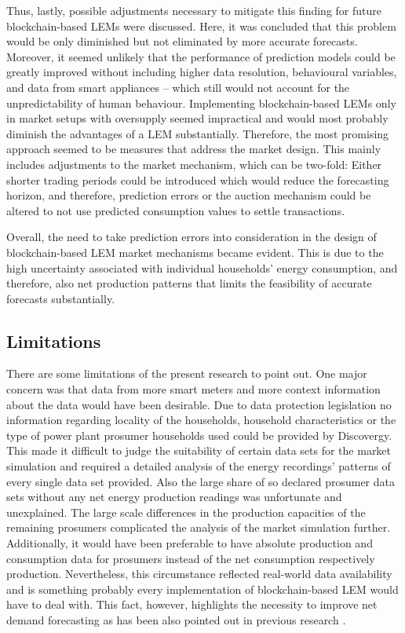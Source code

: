 Thus, lastly, possible adjustments necessary to mitigate this finding for future blockchain-based LEMs were discussed. Here, it was concluded that this problem would be only diminished but not eliminated by more accurate forecasts. Moreover, it seemed unlikely that the performance of prediction models could be greatly improved without including higher data resolution, behavioural variables, and data from smart appliances -- which still would not account for the unpredictability of human behaviour. Implementing blockchain-based LEMs only in market setups with oversupply seemed impractical and would most probably diminish the advantages of a LEM substantially. Therefore, the most promising approach seemed to be measures that address the market design. This mainly includes adjustments to the market mechanism, which can be two-fold: Either shorter trading periods could be introduced which would reduce the forecasting horizon, and therefore, prediction errors or the auction mechanism could be altered to not use predicted consumption values to settle transactions.

Overall, the need to take prediction errors into consideration in the design of blockchain-based LEM market mechanisms became evident. This is due to the high uncertainty associated with individual households' energy consumption, and therefore, also net production patterns that limits the feasibility of accurate forecasts substantially.




\subsection{Limitations}\label{Sec:Conclusion;Subsec:Discussion}

There are some limitations of the present research to point out. One major concern was that data from more smart meters and more context information about the data would have been desirable. Due to data protection legislation no information regarding locality of the households, household characteristics or the type of power plant prosumer households used could be provided by Discovergy. This made it difficult to judge the suitability of certain data sets for the market simulation and required a detailed analysis of the energy recordings' patterns of every single data set provided. Also the large share of so declared prosumer data sets without any net energy production readings was unfortunate and unexplained. The large scale differences in the production capacities of the remaining prosumers complicated the analysis of the market simulation further. Additionally, it would have been preferable to have absolute production and consumption data for prosumers instead of the net consumption respectively production. Nevertheless, this circumstance reflected real-world data availability and is something probably every implementation of blockchain-based LEM would have to deal with. This fact, however, highlights the necessity to improve net demand forecasting as has been also pointed out in previous research \citep[e.g.,][]{Meer:2018, Hong:2016}.

